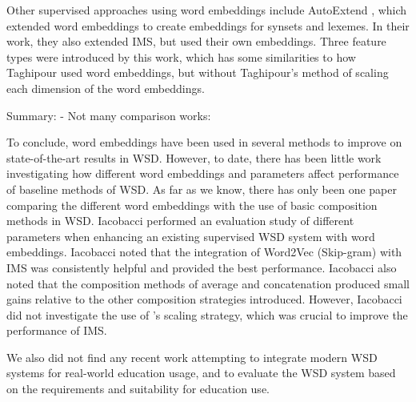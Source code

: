 Other supervised approaches using word embeddings include AutoExtend \cite{rothe2015autoextend}, which extended word embeddings to create embeddings for synsets and lexemes. In their work, they also extended IMS, but used their own embeddings. Three feature types were introduced by this work, which has some similarities to how Taghipour used word embeddings, but without Taghipour's method of scaling each dimension of the word embeddings. 


Summary:
 - Not many comparison works: \cite{Iacobacci2016}
 
To conclude, word embeddings have been used in several methods to improve on state-of-the-art results in WSD. However, to date, there has been little work investigating how different word embeddings and parameters affect performance of baseline methods of WSD. As far as we know, there has only been one paper comparing the different word embeddings with the use of basic composition methods in WSD. Iacobacci  performed an evaluation study of different parameters when enhancing an existing supervised WSD system with word embeddings. Iacobacci noted that the integration of Word2Vec (Skip-gram) with IMS was consistently helpful and provided the best performance. Iacobacci also noted that the composition methods of average and concatenation produced small gains relative to the other composition strategies introduced. However, Iacobacci did not investigate the use of \cite{Taghipour15}'s scaling strategy, which was crucial to improve the performance of IMS.


We also did not find any recent work attempting to integrate modern WSD systems for real-world education usage, and to evaluate the WSD system based on the requirements and suitability for education use. 

